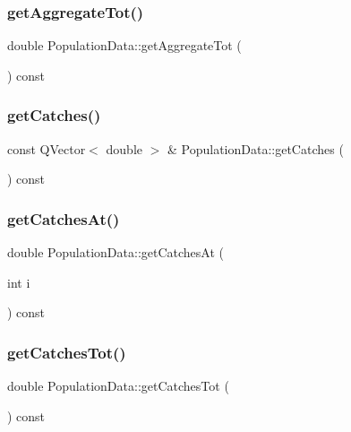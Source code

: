 \subsubsection{\texorpdfstring{getAggregateTot()}{getAggregateTot()}}
{\footnotesize\ttfamily double Population\+Data\+::get\+Aggregate\+Tot (\begin{DoxyParamCaption}{ }\end{DoxyParamCaption}) const}

\mbox{\label{class_population_data_a7ef29dd6225298f9d68b8e58f3463313}} 
\subsubsection{\texorpdfstring{getCatches()}{getCatches()}}
{\footnotesize\ttfamily const Q\+Vector$<$ double $>$ \& Population\+Data\+::get\+Catches (\begin{DoxyParamCaption}{ }\end{DoxyParamCaption}) const}

\mbox{\label{class_population_data_aa79ab667768a1a78049251a01f8af5eb}} 
\subsubsection{\texorpdfstring{getCatchesAt()}{getCatchesAt()}}
{\footnotesize\ttfamily double Population\+Data\+::get\+Catches\+At (\begin{DoxyParamCaption}\item[{int}]{i }\end{DoxyParamCaption}) const}

\mbox{\label{class_population_data_ad332b43861c5fe6a0c8a43e1205f305a}} 
\subsubsection{\texorpdfstring{getCatchesTot()}{getCatchesTot()}}
{\footnotesize\ttfamily double Population\+Data\+::get\+Catches\+Tot (\begin{DoxyParamCaption}{ }\end{DoxyParamCaption}) const}

